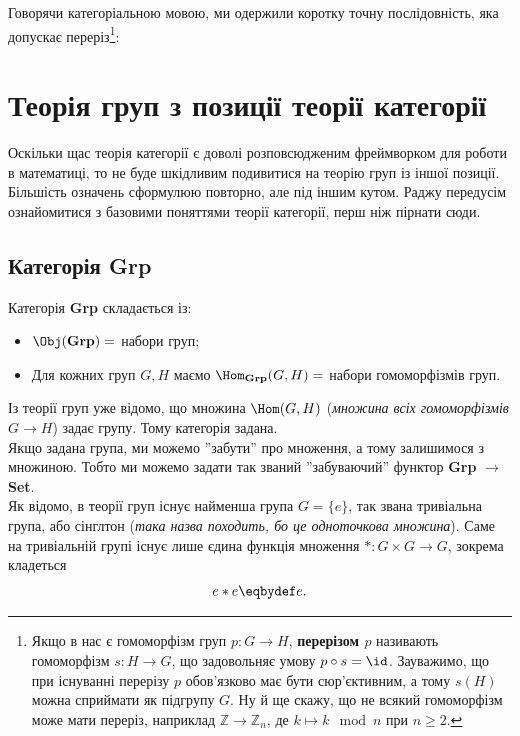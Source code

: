 \documentclass{math_library}
\begin{document}
\begin{remark}
Говорячи категоріальною мовою, ми одержили коротку точну послідовність, яка допускає переріз\footnote{Якщо в нас є гомоморфізм груп $p \colon G \to H$, \textbf{перерізом $p$} називають гомоморфізм $s \colon H \to G$, що задовольняє умову $p \circ s = \id$. Зауважимо, що при існуванні перерізу $p$ обов'язково має бути сюр'єктивним, а тому $s(H)$ можна сприймати як підгрупу $G$. Ну й ще скажу, що не всякий гомоморфізм може мати переріз, наприклад $\mathbb{Z} \to \mathbb{Z}_n$, де $k \mapsto k \mod n$ при $n \geq 2$.}:
\begin{figure}[H]
\centering
{}
\end{figure}
\end{remark}
\newpage

\section{Теорія груп з позиції теорії категорії}
Оскільки щас теорія категорії є доволі розповсюдженим фреймворком для роботи в математиці, то не буде шкідливим подивитися на теорію груп із іншої позиції. Більшість означень сформулюю повторно, але під іншим кутом. Раджу передусім ознайомитися з базовими поняттями теорії категорії, перш ніж пірнати сюди.

\subsection{Категорія \textbf{Grp}}
Категорія \textbf{Grp} складається із:
\begin{itemize}[nosep]
\item $\Obj(\textbf{Grp}) = $ набори груп;
\item Для кожних груп $G,H$ маємо $\Hom_\textbf{Grp}(G,H) = $ набори гомоморфізмів груп.
\end{itemize}
Із теорії груп уже відомо, що множина $\Hom(G,H)$ (\textit{множина всіх гомоморфізмів $G \to H$}) задає групу. Тому категорія задана.
\bigskip \\
Якщо задана група, ми можемо ''забути'' про множення, а тому залишимося з множиною. Тобто ми можемо задати так званий ''забуваючий'' функтор \textbf{Grp} $\to$ \textbf{Set}.
\bigskip \\
Як відомо, в теорії груп існує найменша група $G = \{e\}$, так звана тривіальна група, або сінглтон (\textit{така назва походить, бо це одноточкова множина}). Саме на тривіальній групі існує лише єдина функція множення $* \colon G \times G \to G$, зокрема кладеться
\[
e*e \eqbydef e.
\]
\end{document}
